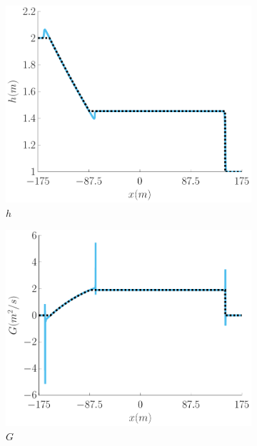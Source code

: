 \documentclass[10pt]{article}
\begin{document}
\begin{figure}
	\centering
	\begin{subfigure}{0.32\textwidth}
		\centering
		\includegraphics[width=\textwidth]{./Figures/Simulations/Study/RegSWWE/Convergence/h.pdf}
		\caption{$h$}
	\end{subfigure}
	\begin{subfigure}{0.32\textwidth}
	\centering
	\includegraphics[width=\textwidth]{./Figures/Simulations/Study/RegSWWE/Convergence/G.pdf}
	\caption{$G$}
	\end{subfigure}
	\begin{subfigure}{0.32\textwidth}

\end{subfigure}
\end{figure}
\end{document}
